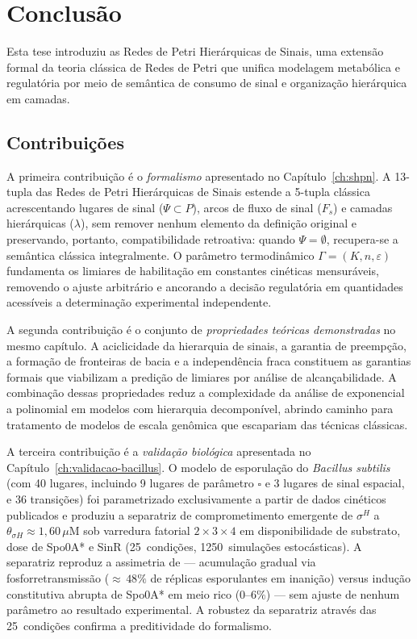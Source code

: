 \chapter{Conclusão}
\label{ch:conclusao}

Esta tese introduziu as Redes de Petri Hierárquicas de Sinais, uma extensão
formal da teoria clássica de Redes de Petri que unifica modelagem metabólica e
regulatória por meio de semântica de consumo de sinal e organização hierárquica
em camadas.

\section{Contribuições}
\label{sec:contribuicoes}

\begin{sloppypar}
A primeira contribuição é o \emph{formalismo} apresentado no
Capítulo~\ref{ch:shpn}. A 13-tupla das Redes de Petri Hie\-rár\-qui\-cas
de Sinais
estende a 5-tupla clássica acrescentando lugares de sinal
($\Psi \subset P$), arcos de fluxo de sinal ($F_s$) e camadas hierárquicas
($\lambda$), sem remover nenhum elemento da definição original e preservando,
portanto, compatibilidade retroativa: quando $\Psi = \emptyset$, recupera-se a
semântica clássica integralmente. O parâmetro termodinâmico $\Gamma = (K, n,
\varepsilon)$ fundamenta os limiares de habilitação em constantes cinéticas
mensuráveis, removendo o ajuste arbitrário e ancorando a decisão regulatória em
quantidades acessíveis a determinação experimental independente.

A segunda contribuição é o conjunto de \emph{propriedades teóricas demonstradas}
no mesmo capítulo. A aciclicidade da hierarquia de sinais, a garantia de
preempção, a formação de fronteiras de bacia e a independência fraca constituem
as garantias formais que viabilizam a predição de limiares por análise de
alcança\-bilidade. A combinação dessas propriedades reduz a complexidade da
análise de exponencial a polinomial em modelos com hierarquia
de\-com\-po\-ní\-vel, abrindo caminho para tratamento de modelos de escala
ge\-nô\-mi\-ca que escapariam das técnicas clássicas.

A terceira contribuição é a \emph{validação biológica} apresentada no
Capítulo~\ref{ch:validacao-bacillus}. O modelo de esporulação do
\textit{Bacillus subtilis} (com 40 lugares, incluindo
9 lugares de parâmetro $\square$ e 3 lugares de sinal espacial, e 36
transições) foi parametrizado exclusivamente a partir de dados
cinéticos publicados e produziu a separatriz de comprometimento emergente de
$\sigma^H$ a $\theta_{\sigma H} \approx 1{,}60\,\mu$M sob varredura fatorial
$2 \times 3 \times 4$ em disponibilidade de substrato, dose de Spo0A* e SinR
(25~condições, 1250~simulações estocásticas). A separatriz reproduz a
assimetria de \textcite{Fujita2005} --- acumulação gradual via fosforretransmissão
(${\approx}\,48\%$ de réplicas esporulantes em inanição) versus indução constitutiva
abrupta de Spo0A* em meio rico ($0$--$6\%$) --- sem ajuste de nenhum parâmetro
ao resultado experimental.
A robustez da separatriz através das 25~condições confirma a
preditividade do formalismo.


\end{sloppypar}
